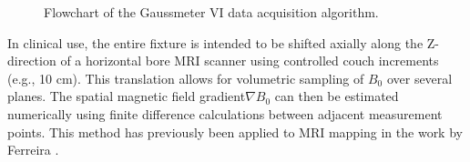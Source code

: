 \begin{figure}[H]
	\centering
	
	\caption{Flowchart of the Gaussmeter VI data acquisition algorithm.}
	\label{fig:gaussmeter-flowchart}
\end{figure}

In clinical use, the entire fixture is intended to be shifted axially along the Z-direction of a horizontal bore MRI scanner using controlled couch increments (e.g., 10 cm). This translation allows for volumetric sampling of $B_0$ over several planes. The spatial magnetic field gradient$\nabla B_0$ can then be estimated numerically using finite difference calculations between adjacent measurement points. This method has previously been applied to MRI mapping in the work by Ferreira \cite{ferreira2017}.



